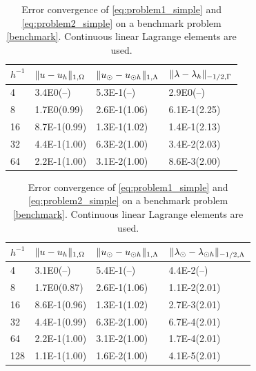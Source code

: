 %
\begin{table}
  \scriptsize{
    \begin{minipage}{0.49\textwidth}
  \begin{center}
    \begin{tabular}{l|lll}
      \hline
    $h^{-1}$ & $\lVert{u-u_h}\rVert_{1, \Omega}$ & $\lVert{u_{\odot}-u_{\odot h}}\rVert_{1, \Lambda}$ & $\lVert{\lambda-\lambda_h}\rVert_{-1/2,\Gamma}$\\
      \hline
4  & 3.4E0(--) & 5.3E-1(--) & 2.9E0(--)\\
8  & 1.7E0(0.99) & 2.6E-1(1.06) & 6.1E-1(2.25)\\
16 & 8.7E-1(0.99) & 1.3E-1(1.02) & 1.4E-1(2.13)\\
32 & 4.4E-1(1.00) & 6.3E-2(1.00) & 3.4E-2(2.03)\\
64 & 2.2E-1(1.00) & 3.1E-2(1.00) & 8.6E-3(2.00)\\
\hline
  \end{tabular}
  \end{center}
  \end{minipage}
    }
    \vspace{5pt}
  \scriptsize{%
    \begin{minipage}{0.49\textwidth}
      \begin{center}
        \begin{tabular}{l|lll}
      \hline
    $h^{-1}$ & $\lVert{u-u_h}\rVert_{1, \Omega}$ & $\lVert{u_{\odot}-u_{\odot h}}\rVert_{1, \Lambda}$ & $\lVert{\lambda_{\odot}-\lambda_{\odot h}}\rVert_{-1/2, \Lambda}$\\
      \hline
4   & 3.1E0(--)    & 5.4E-1(--)   & 4.4E-2(--)   \\
8   & 1.7E0(0.87)  & 2.6E-1(1.06) & 1.1E-2(2.01) \\
16  & 8.6E-1(0.96) & 1.3E-1(1.02) & 2.7E-3(2.01) \\
32  & 4.4E-1(0.99) & 6.3E-2(1.00) & 6.7E-4(2.01) \\
64  & 2.2E-1(1.00) & 3.1E-2(1.00) & 1.7E-4(2.01) \\
128 & 1.1E-1(1.00) & 1.6E-2(1.00) & 4.1E-5(2.01) \\
\hline
  \end{tabular}
  \end{center}
  \end{minipage}
  }
  \caption{Error convergence of \eqref{eq:problem1_simple} and \eqref{eq:problem2_simple}
    on a benchmark problem \eqref{benchmark}. Continuous linear Lagrange
    elements are used.
  }
  \label{tab:error_conform}
\end{table}


